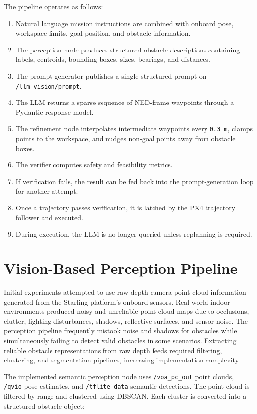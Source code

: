 \documentclass[11pt]{article}
\begin{document}
The pipeline operates as follows:

\begin{enumerate}
  \item Natural language mission instructions are combined with onboard pose, workspace limits, goal position, and obstacle information.
  \item The perception node produces structured obstacle descriptions containing labels, centroids, bounding boxes, sizes, bearings, and distances.
  \item The prompt generator publishes a single structured prompt on \texttt{/llm\_vision/prompt}.
  \item The LLM returns a sparse sequence of NED-frame waypoints through a Pydantic response model.
  \item The refinement node interpolates intermediate waypoints every \texttt{0.3 m}, clamps points to the workspace, and nudges non-goal points away from obstacle boxes.
  \item The verifier computes safety and feasibility metrics.
  \item If verification fails, the result can be fed back into the prompt-generation loop for another attempt.
  \item Once a trajectory passes verification, it is latched by the PX4 trajectory follower and executed.
  \item During execution, the LLM is no longer queried unless replanning is required.
\end{enumerate}

\section{Vision-Based Perception Pipeline}

Initial experiments attempted to use raw depth-camera point cloud information generated from the Starling platform's onboard sensors. Real-world indoor environments produced noisy and unreliable point-cloud maps due to occlusions, clutter, lighting disturbances, shadows, reflective surfaces, and sensor noise. The perception pipeline frequently mistook noise and shadows for obstacles while simultaneously failing to detect valid obstacles in some scenarios. Extracting reliable obstacle representations from raw depth feeds required filtering, clustering, and segmentation pipelines, increasing implementation complexity.

The implemented semantic perception node uses \texttt{/voa\_pc\_out} point clouds, \texttt{/qvio} pose estimates, and \texttt{/tflite\_data} semantic detections. The point cloud is filtered by range and clustered using DBSCAN. Each cluster is converted into a structured obstacle object:
\end{document}
